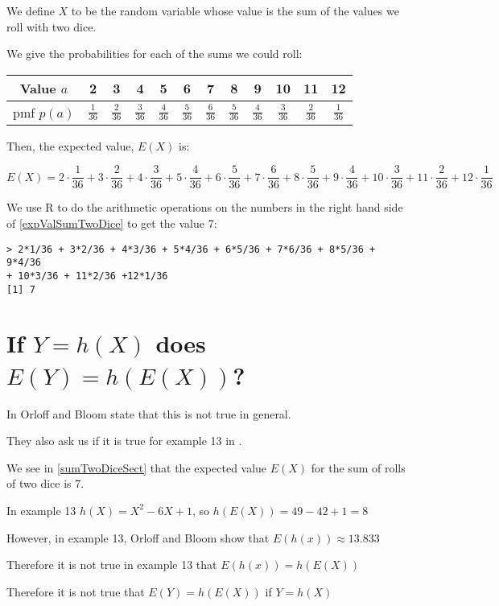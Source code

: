 \documentclass[a4paper,11pt]{article}
\begin{document}
We define $X$ to be the random variable whose value is the sum of
the values we roll with two dice. 

We give the probabilities for each of the sums we could roll:

\begin{center}
  \begin{tabular}{ | c | c | c | c | c |c |c | c | c | c | c |c |}
    \hline
    Value $a$ & 2 & 3 & 4 & 5 & 6 & 7 & 8 & 9 & 10 & 11 & 12\\ \hline
    pmf $p \left( a \right)$  & $\frac{1}{36}$ & $\frac{2}{36}$ & 
      $\frac{3}{36}$ & $\frac{4}{36}$ & $\frac{5}{36}$ & 
      $\frac{6}{36}$ & $\frac{5}{36}$ & $\frac{4}{36}$ & 
      $\frac{3}{36}$ & $\frac{2}{36}$ & $\frac{1}{36}$\\ \hline
  \end{tabular}
\end{center}

Then, the expected value, $E \left ( X \right)$ is:

\begin{equation} \label{expValSumTwoDice}
E \left( X \right)  =  
2 \cdot \frac{1}{36}   + 3 \cdot \frac{2}{36}  
+ 4 \cdot \frac{3}{36}   + 5 \cdot \frac{4}{36}   + 6 \cdot \frac{5}{36}  
+ 7 \cdot \frac{6}{36}  + 8 \cdot \frac{5}{36}  + 9 \cdot \frac{4}{36}  
+ 10 \cdot \frac{3}{36}  + 11 \cdot \frac{2}{36}  
+ 12 \cdot \frac{1}{36}
\end{equation}

We use R to do the arithmetic operations on the numbers in the right
hand side of \ref{expValSumTwoDice} to get the value 7:

\begin{lstlisting}
> 2*1/36 + 3*2/36 + 4*3/36 + 5*4/36 + 6*5/36 + 7*6/36 + 8*5/36 + 9*4/36
+ 10*3/36 + 11*2/36 +12*1/36
[1] 7
\end{lstlisting}

\section{If $Y = h \left( X \right)$ does 
  $E \left( Y \right) = h \left( E \left( X \right) \right)$?}

In \cite{reading4b} Orloff and Bloom state that this is not true in
general.

They also ask us if it is true for example 13 in \cite{reading4b}.

We see in \ref{sumTwoDiceSect} that the expected value 
$E \left( X \right)$ for the sum of rolls of two dice is 7.

In example 13 $h \left( X \right) = X^2 -6X + 1$, so
$h \left( E \left ( X \right) \right) = 49 - 42 + 1 = 8$

However, in example 13, Orloff and Bloom show that
$E \left( h \left( x \right) \right) \approx 13.833$ 

Therefore it is not true in example 13 that 
$ E \left( h \left( x \right) \right) =
h \left( E \left ( X \right) \right) $

Therefore it is not true that $E \left( Y \right) = 
h \left( E \left( X \right) \right)$ if $Y = h \left( X \right)$
  

\printbibliography{}
\end{document}
